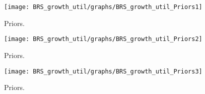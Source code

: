  
\begin{figure}[H]
\centering
\texttt{[image: BRS\_growth\_util/graphs/BRS\_growth\_util\_Priors1]}
\caption{Priors.}\label{Fig:Priors:1}
\end{figure}
\begin{figure}[H]
\centering
\texttt{[image: BRS\_growth\_util/graphs/BRS\_growth\_util\_Priors2]}
\caption{Priors.}\label{Fig:Priors:2}
\end{figure}
\begin{figure}[H]
\centering
\texttt{[image: BRS\_growth\_util/graphs/BRS\_growth\_util\_Priors3]}
\caption{Priors.}\label{Fig:Priors:3}
\end{figure}
 
